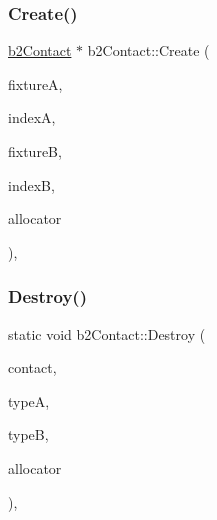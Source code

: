 \subsubsection{\texorpdfstring{Create()}{Create()}}
{\footnotesize\ttfamily \mbox{\hyperlink{classb2_contact}{b2\+Contact}} $\ast$ b2\+Contact\+::\+Create (\begin{DoxyParamCaption}\item[{\mbox{\hyperlink{classb2_fixture}{b2\+Fixture}} $\ast$}]{fixtureA,  }\item[{\mbox{\hyperlink{b2_settings_8h_a43d43196463bde49cb067f5c20ab8481}{int32}}}]{indexA,  }\item[{\mbox{\hyperlink{classb2_fixture}{b2\+Fixture}} $\ast$}]{fixtureB,  }\item[{\mbox{\hyperlink{b2_settings_8h_a43d43196463bde49cb067f5c20ab8481}{int32}}}]{indexB,  }\item[{\mbox{\hyperlink{classb2_block_allocator}{b2\+Block\+Allocator}} $\ast$}]{allocator }\end{DoxyParamCaption})\hspace{0.3cm}{\ttfamily [static]}, {\ttfamily [protected]}}

\mbox{\label{classb2_contact_a36c1f6767f212f2e4ddb4c4b2c7cdb75}} 
\subsubsection{\texorpdfstring{Destroy()}{Destroy()}\hspace{0.1cm}{\footnotesize\ttfamily [1/2]}}
{\footnotesize\ttfamily static void b2\+Contact\+::\+Destroy (\begin{DoxyParamCaption}\item[{\mbox{\hyperlink{classb2_contact}{b2\+Contact}} $\ast$}]{contact,  }\item[{\mbox{\hyperlink{classb2_shape_a4c1f3a9ad6b3150bb90ad9018ca4b1e0}{b2\+Shape\+::\+Type}}}]{typeA,  }\item[{\mbox{\hyperlink{classb2_shape_a4c1f3a9ad6b3150bb90ad9018ca4b1e0}{b2\+Shape\+::\+Type}}}]{typeB,  }\item[{\mbox{\hyperlink{classb2_block_allocator}{b2\+Block\+Allocator}} $\ast$}]{allocator }\end{DoxyParamCaption})\hspace{0.3cm}{\ttfamily [static]}, {\ttfamily [protected]}}

